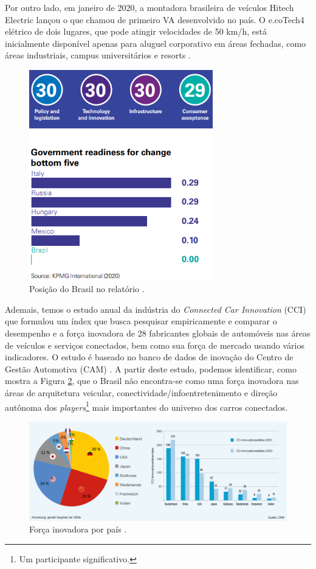 Por outro lado, em janeiro de 2020, a montadora brasileira de veículos Hitech Electric lançou o que chamou de primeiro VA desenvolvido no país. O e.coTech4 elétrico de dois lugares, que pode atingir velocidades de 50 km/h, está inicialmente disponível apenas para aluguel corporativo em áreas fechadas, como áreas industriais, campus universitários e resorts \cite{KPMG}.

\begin{figure}[H]
\centering
\includegraphics[width=8cm]{Figures/rank30.png}
\caption{Posição do Brasil no relatório \cite{KPMG}.}
\label{rank30}
\end{figure}

Ademais, temos o estudo anual da indústria do \textit{Connected Car Innovation} (CCI) que formulou um índex que busca pesquisar empiricamente e comparar o desempenho e a força inovadora de 28 fabricantes globais de automóveis nas áreas de veículos e serviços conectados, bem como sua força de mercado usando vários indicadores. O estudo é baseado no banco de dados de inovação do Centro de Gestão Automotiva (CAM) \cite{CCI}. A partir deste estudo, podemos identificar, como mostra a Figura \ref{forcaCCI}, que o Brasil não encontra-se como uma força inovadora nas áreas de arquitetura veicular, conectividade/infoentretenimento e direção autônoma dos \textit{players}\footnote{Um participante significativo.} mais importantes do universo dos carros conectados.


\begin{figure}[H]
\centering
\includegraphics[width=12cm]{Figures/CCI.jpg}
\caption{Força inovadora por país  \cite{CCI}.}
\label{forcaCCI}
\end{figure}


